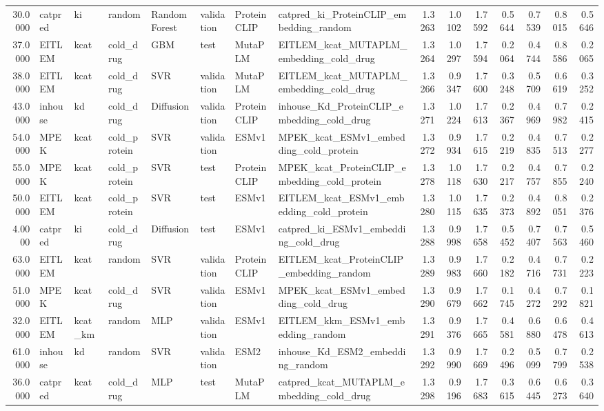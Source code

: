 \begin{tabular}{rlllllllrrrrrrr}
30.0000 & catpred & ki & random & Random Forest & validation & ProteinCLIP & catpred_ki_ProteinCLIP_embedding_random & 1.3263 & 1.0102 & 1.7592 & 0.5644 & 0.7539 & 0.8015 & 0.5646 \\
37.0000 & EITLEM & kcat & cold_drug & GBM & test & MutaPLM & EITLEM_kcat_MUTAPLM_embedding_cold_drug & 1.3264 & 1.0297 & 1.7594 & 0.2064 & 0.4744 & 0.8586 & 0.2065 \\
38.0000 & EITLEM & kcat & cold_drug & SVR & validation & MutaPLM & EITLEM_kcat_MUTAPLM_embedding_cold_drug & 1.3266 & 0.9347 & 1.7600 & 0.3248 & 0.5709 & 0.6619 & 0.3252 \\
43.0000 & inhouse & kd & cold_drug & Diffusion & validation & ProteinCLIP & inhouse_Kd_ProteinCLIP_embedding_cold_drug & 1.3271 & 1.0224 & 1.7613 & 0.2367 & 0.4969 & 0.7982 & 0.2415 \\
54.0000 & MPEK & kcat & cold_protein & SVR & validation & ESMv1 & MPEK_kcat_ESMv1_embedding_cold_protein & 1.3272 & 0.9934 & 1.7615 & 0.2219 & 0.4835 & 0.7513 & 0.2277 \\
55.0000 & MPEK & kcat & cold_protein & SVR & test & ProteinCLIP & MPEK_kcat_ProteinCLIP_embedding_cold_protein & 1.3278 & 1.0118 & 1.7630 & 0.2217 & 0.4757 & 0.7855 & 0.2240 \\
50.0000 & EITLEM & kcat & cold_protein & SVR & test & ESMv1 & EITLEM_kcat_ESMv1_embedding_cold_protein & 1.3280 & 1.0115 & 1.7635 & 0.2373 & 0.4892 & 0.8051 & 0.2376 \\
4.0000 & catpred & ki & cold_drug & Diffusion & test & ESMv1 & catpred_ki_ESMv1_embedding_cold_drug & 1.3288 & 0.9998 & 1.7658 & 0.5452 & 0.7407 & 0.7563 & 0.5460 \\
63.0000 & EITLEM & kcat & random & SVR & validation & ProteinCLIP & EITLEM_kcat_ProteinCLIP_embedding_random & 1.3289 & 0.9983 & 1.7660 & 0.2182 & 0.4716 & 0.7731 & 0.2223 \\
51.0000 & MPEK & kcat & cold_drug & SVR & validation & ESMv1 & MPEK_kcat_ESMv1_embedding_cold_drug & 1.3290 & 0.9679 & 1.7662 & 0.1745 & 0.4272 & 0.7292 & 0.1821 \\
32.0000 & EITLEM & kcat_km & random & MLP & validation & ESMv1 & EITLEM_kkm_ESMv1_embedding_random & 1.3291 & 0.9376 & 1.7665 & 0.4581 & 0.6880 & 0.6478 & 0.4613 \\
61.0000 & inhouse & kd & random & SVR & validation & ESM2 & inhouse_Kd_ESM2_embedding_random & 1.3292 & 0.9990 & 1.7669 & 0.2496 & 0.5099 & 0.7799 & 0.2538 \\
36.0000 & catpred & kcat & cold_drug & MLP & test & MutaPLM & catpred_kcat_MUTAPLM_embedding_cold_drug & 1.3298 & 0.9196 & 1.7683 & 0.3615 & 0.6445 & 0.6273 & 0.3640 \\

\end{tabular}

